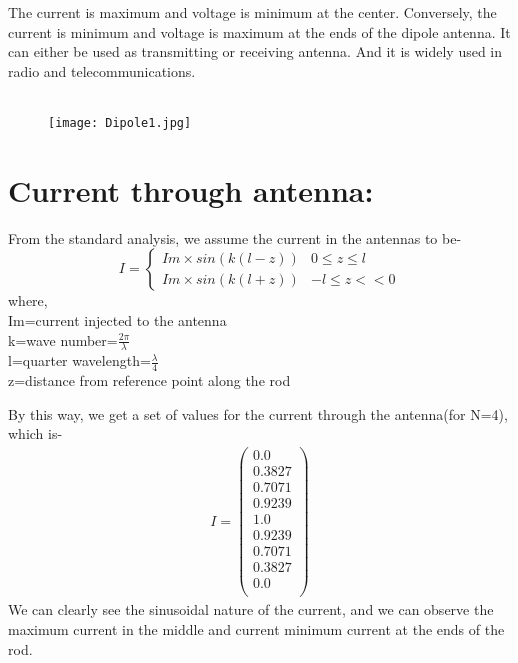 \documentclass[12pt]{article}
\begin{document}
The current is maximum and voltage is minimum at the center. Conversely, the current is minimum and voltage is maximum at the ends of the dipole antenna. It can either be used as transmitting or receiving antenna. And it is widely used in radio and telecommunications.\\\\


\begin{figure}[h!]
\centering
\texttt{[image: Dipole1.jpg]}
\label{fig:exemplo}
\end{figure}

\newpage
\section*{Current through antenna: }

From the standard analysis, we assume the current in the antennas to be-
  \begin{equation}
    I=
    \begin{cases}
      Im\times sin(k(l-z)) &  0 \le z \le l \\
      Im\times sin(k(l+z))  &  −l \le z \lt< 0 
    \end{cases}
  \end{equation}
where,\\
Im=current injected to the antenna\\
k=wave number=$\frac{2\pi}{\lambda}$ \\
l=quarter wavelength=$\frac{\lambda}{4}$ \\
z=distance from reference point along the rod

By this way, we get a set of values for the current through the antenna(for N=4), which is-
\begin{gather*}
    I
    =
    \begin{pmatrix}
    0.0\\
    0.3827\\
    0.7071\\
    0.9239\\
    1.0\\
    0.9239\\
    0.7071\\
    0.3827\\
    0.0\\
    \end{pmatrix}
\end{gather*}
We can clearly see the sinusoidal nature of the current, and we can observe the maximum current in the middle and current minimum current at the ends of the rod.
\end{document}
